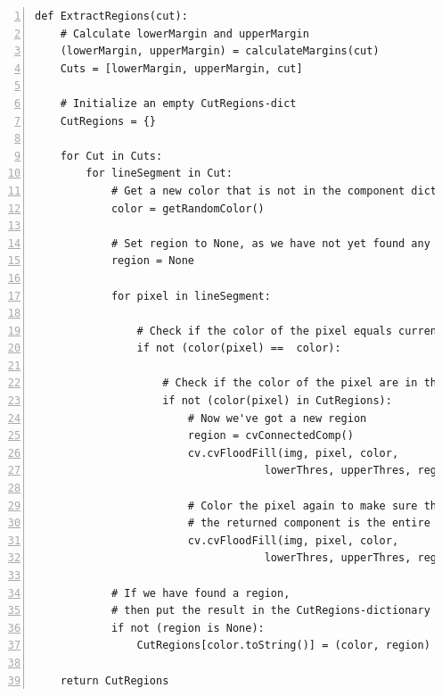 {\begin{lstlisting}[caption={Pseudokode til udtrækning af regioner med
    margin.},captionpos=b,label={pseudo_udtraek_margin},numbers=left,
    frame=single, breaklines=false, float=h]
def ExtractRegions(cut):
    # Calculate lowerMargin and upperMargin
    (lowerMargin, upperMargin) = calculateMargins(cut)
    Cuts = [lowerMargin, upperMargin, cut]

    # Initialize an empty CutRegions-dict
    CutRegions = {}

    for Cut in Cuts:
        for lineSegment in Cut:
            # Get a new color that is not in the component dictionary
            color = getRandomColor()

            # Set region to None, as we have not yet found any
            region = None

            for pixel in lineSegment:

                # Check if the color of the pixel equals current color
                if not (color(pixel) ==  color):

                    # Check if the color of the pixel are in the saved regions
                    if not (color(pixel) in CutRegions):
                        # Now we've got a new region
                        region = cvConnectedComp()
                        cv.cvFloodFill(img, pixel, color,
                                    lowerThres, upperThres, region)

                        # Color the pixel again to make sure that
                        # the returned component is the entire region
                        cv.cvFloodFill(img, pixel, color,
                                    lowerThres, upperThres, region)

            # If we have found a region,
            # then put the result in the CutRegions-dictionary
            if not (region is None):
                CutRegions[color.toString()] = (color, region)

    return CutRegions
\end{lstlisting}

}
